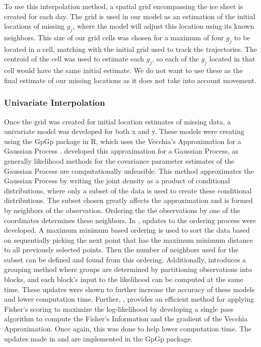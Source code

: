 \documentclass[12pt]{article}
\begin{document}
To use this interpolation method, a spatial grid encompassing the ice
sheet is created for each day. The grid is used in our model as an
estimation of the initial locations of missing \(g_j\), where the model
will adjust this location using its known neighbors. This size of our
grid cells was chosen for a maximum of four \(g_j\) to be located in a
cell, matching with the initial grid used to track the trajectories. The
centroid of the cell was used to estimate each \(g_j\), so each of the
\(g_j\) located in that cell would have the same initial estimate. We do
not want to use these as the final estimate of our missing locations as
it does not take into account movement.

\hypertarget{univariate-interpolation}{%
\subsubsection{Univariate
Interpolation}\label{univariate-interpolation}}

Once the grid was created for initial location estimates of missing
data, a univariate model was developed for both x and y. These models
were creating using the GpGp package in R, which uses the Vecchia's
Approximation for a Gaussian Process \citep{gpgp_pkg}.
\citet{vecchia1988estimation} developed this approximation for a
Gaussian Process, as generally likelihood methods for the covariance
parameter estimates of the Gaussian Process are computationally
unfeasible. This method approximates the Gaussian Process by writing the
joint density as a product of conditional distributions, where only a
subset of the data is used to create these conditional distributions.
The subset chosen greatly affects the approximation and is formed by
neighbors of the observation. Ordering the the observations by one of
the coordinates determines these neighbors. In
\citet{guinness_permutation_2018}, updates to the ordering process were
developed. A maximum minimum based ordering is used to sort the data
based on sequentially picking the next point that has the maximum
minimum distance to all previously selected points. Then the number of
neighbors used for the subset can be defined and found from this
ordering. Additionally, \citet{guinness_permutation_2018} introduces a
grouping method where groups are determined by partitioning observations
into blocks, and each block's input to the likelihood can be computed at
the same time. These updates were shown to further increase the accuracy
of these models and lower computation time. Further,
\citet{guinness_gaussian_2021}, provides an efficient method for
applying Fisher's scoring to maximize the log-likelihood by developing a
single pass algorithm to compute the Fisher's Information and the
gradient of the Vecchia Approximation. Once again, this was done to help
lower computation time. The updates made in
\citet{guinness_permutation_2018} and \citet{guinness_gaussian_2021} are
implemented in the GpGp package.
\end{document}
